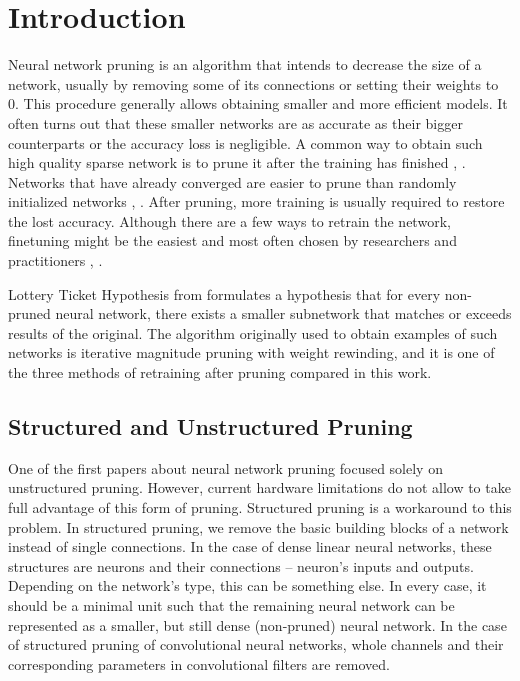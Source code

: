 \section{Introduction}

Neural network pruning is an algorithm that intends to decrease the size of a network, usually by removing some of its connections or setting their weights to 0. 
This procedure generally allows obtaining smaller and more efficient models.
It often turns out that these smaller networks are as accurate as their bigger counterparts or the accuracy loss is negligible.
A common way to obtain such high quality sparse network is to prune it after the training has finished \cite{Frankle}, \cite{rethinking}.
Networks that have already converged are easier to prune than randomly initialized networks \cite{snip}, \cite{rethinking}.
After pruning, more training is usually required to restore the lost accuracy.
Although there are a few ways to retrain the network, finetuning might be the easiest and most often chosen by researchers and practitioners \cite{Renda}, \cite{rethinking}.

Lottery Ticket Hypothesis from \cite{Frankle} formulates a hypothesis that for every non-pruned neural network, there exists a smaller subnetwork that matches or exceeds results of the original. The algorithm originally used to obtain examples of such networks is iterative magnitude pruning with weight rewinding, and it is one of the three methods of retraining after pruning compared in this work.

\subsection{Structured and Unstructured Pruning}

One of the first papers about neural network pruning \cite{optimal} focused solely on unstructured pruning.
However, current hardware limitations do not allow to take full advantage of this form of pruning.
Structured pruning is a workaround to this problem.
In structured pruning, we remove the basic building blocks of a network instead of single connections.
In the case of dense linear neural networks, these structures are neurons and their connections -- neuron's inputs and outputs.
Depending on the network's type, this can be something else.
In every case, it should be a minimal unit such that the remaining neural network can be represented as a smaller, but still dense (non-pruned) neural network.
In the case of structured pruning of convolutional neural networks, whole channels and their corresponding parameters in convolutional filters are removed.


